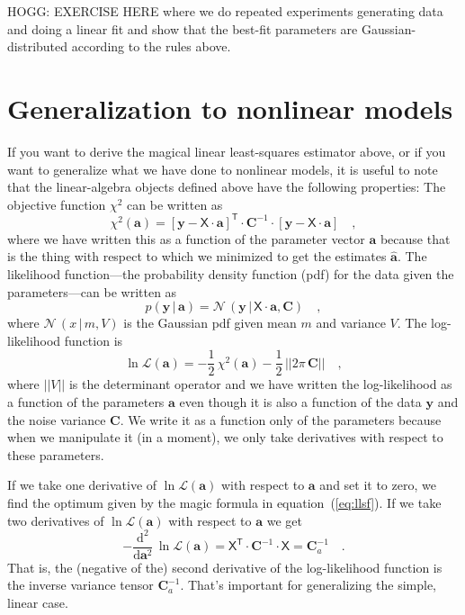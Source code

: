 \documentclass[10pt]{article}
\newcommand{\equationname}{equation}
\newcommand{\given}{\,|\,}
\newcommand{\dd}{\mathrm{d}}
\newcommand{\T}{^{\!\mathsf{T}\!}}
\newcommand{\inv}{^{-1}}
\renewcommand{\vector}[1]{\boldsymbol{#1}}
\newcommand{\tensor}[1]{\mathbf{#1}}
\renewcommand{\matrix}[1]{\mathsf{#1}}
\newcommand{\normal}{\mathcal{N}\!\,}
\newcommand{\like}{\mathscr{L}}
\newcommand{\va}{\vector{a}}
\newcommand{\vy}{\vector{y}}
\newcommand{\tC}{\tensor{C}}
\newcommand{\mX}{\matrix{X}}
\begin{document}
HOGG: EXERCISE HERE where we do repeated experiments generating data
and doing a linear fit and show that the best-fit parameters are
Gaussian-distributed according to the rules above.

\section{Generalization to nonlinear models}\label{sec:nonlinear}

If you want to derive the magical linear least-squares estimator above,
or if you want to generalize what we have done to nonlinear models,
it is useful to note that the linear-algebra objects defined
above have the following properties:
The objective function $\chi^2$ can be written as
\begin{equation}
  \chi^2(\va) = [\vy - \mX\cdot\va]\T\cdot\tC\inv\cdot[\vy - \mX\cdot\va]
  \quad,
\end{equation}
where we have written this as a function of the parameter vector $\va$ because
that is the thing with respect to which we minimized to get the estimates
$\hat{\va}$.
The likelihood function---the probability density function (pdf) for
the data given the parameters---can be written as
\begin{equation}
  p(\vy\given\va) = \normal(\vy\given\mX\cdot\va,\tC)
  \quad,
\end{equation}
where $\normal(x\given m,V)$ is the Gaussian pdf given mean $m$ and variance $V$.
The log-likelihood function is
\begin{equation}
  \ln\like(\va) = -\frac{1}{2}\,\chi^2(\va) -\frac{1}{2}\,||2\pi\,\tC||
  \quad,
\end{equation}
where $||V||$ is the determinant operator and we have written the
log-likelihood as a function of the parameters $\va$ even though it is
also a function of the data $\vy$ and the noise variance $\tC$.
We write it as a function only of the parameters because when we manipulate it
(in a moment), we only take derivatives with respect to these parameters.

If we take one derivative of $\ln\like(\va)$ with respect to $\va$ and set it
to zero, we find the optimum given by the magic formula in
\equationname~(\ref{eq:llsf}).
If we take two derivatives of $\ln\like(\va)$ with respect to $\va$ we get
\begin{equation}
  -\frac{\dd^2}{\dd\va^2}\,\ln\like(\va) = \mX\T\cdot\tC\inv\cdot\mX = \tC_a\inv
  \quad.
\end{equation}
That is, the (negative of the) second derivative of the log-likelihood function is
the inverse variance tensor $\tC_a\inv$.
That's important for generalizing the simple, linear case.
\end{document}
